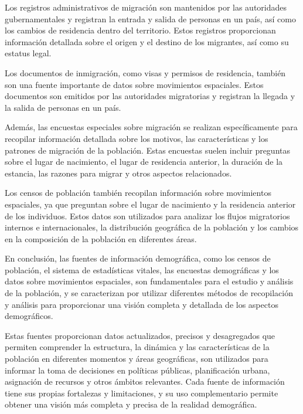 \documentclass[8pt,a4paper]{beamer}
\begin{document}
{\begin{frame}{}
\begin{block}{}
\justifying
Los registros administrativos de migración son mantenidos por las autoridades gubernamentales y registran la entrada y salida de personas en un país, así como los cambios de residencia dentro del territorio. Estos registros proporcionan información detallada sobre el origen y el destino de los migrantes, así como su estatus legal.

Los documentos de inmigración, como visas y permisos de residencia, también son una fuente importante de datos sobre movimientos espaciales. Estos documentos son emitidos por las autoridades migratorias y registran la llegada y la salida de personas en un país.

Además, las encuestas especiales sobre migración se realizan específicamente para recopilar información detallada sobre los motivos, las características y los patrones de migración de la población. Estas encuestas suelen incluir preguntas sobre el lugar de nacimiento, el lugar de residencia anterior, la duración de la estancia, las razones para migrar y otros aspectos relacionados.

Los censos de población también recopilan información sobre movimientos espaciales, ya que preguntan sobre el lugar de nacimiento y la residencia anterior de los individuos. Estos datos son utilizados para analizar los flujos migratorios internos e internacionales, la distribución geográfica de la población y los cambios en la composición de la población en diferentes áreas.
\end{block}
\end{frame}


\begin{frame}{}
En conclusión, las fuentes de información demográfica, como los censos de población, el sistema de estadísticas vitales, las encuestas demográficas y los datos sobre movimientos espaciales, son fundamentales para el estudio y análisis de la población, y se caracterizan por utilizar diferentes métodos de recopilación y análisis para proporcionar una visión completa y detallada de los aspectos demográficos. 

Estas fuentes proporcionan datos actualizados, precisos y desagregados que permiten comprender la estructura, la dinámica y las características de la población en diferentes momentos y áreas geográficas, son utilizados para informar la toma de decisiones en políticas públicas, planificación urbana, asignación de recursos y otros ámbitos relevantes. Cada fuente de información tiene sus propias fortalezas y limitaciones, y su uso complementario permite obtener una visión más completa y precisa de la realidad demográfica.


\end{frame}}
\end{document}
